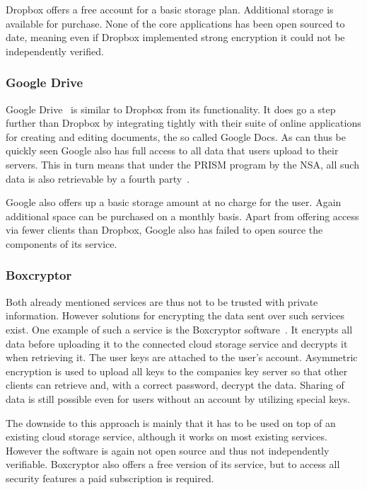 Dropbox offers a free account for a basic storage plan.
Additional storage is available for purchase.
None of the core applications has been open sourced to date, meaning even if Dropbox implemented strong encryption it could not be independently verified.

\subsubsection{Google Drive}

Google Drive~\cite{web:site:gdrive} is similar to Dropbox from its functionality.
It does go a step further than Dropbox by integrating tightly with their suite of online applications for creating and editing documents, the so called Google Docs.
As can thus be quickly seen Google also has full access to all data that users upload to their servers.
This in turn means that under the PRISM program by the NSA, all such data is also retrievable by a fourth party~\cite{web:site:rt:google}.

Google also offers up a basic storage amount at no charge for the user.
Again additional space can be purchased on a monthly basis.
Apart from offering access via fewer clients than Dropbox, Google also has failed to open source the components of its service.

\subsubsection{Boxcryptor}

Both already mentioned services are thus not to be trusted with private information.
However solutions for encrypting the data sent over such services exist.
One example of such a service is the Boxcryptor software~\cite{web:site:boxcryptor}.
It encrypts all data before uploading it to the connected cloud storage service and decrypts it when retrieving it.
The user keys are attached to the user's account.
Asymmetric encryption is used to upload all keys to the companies key server so that other clients can retrieve and, with a correct password, decrypt the data.
Sharing of data is still possible even for users without an account by utilizing special keys.

The downside to this approach is mainly that it has to be used on top of an existing cloud storage service, although it works on most existing services.
However the software is again not open source and thus not independently verifiable.
Boxcryptor also offers a free version of its service, but to access all security features a paid subscription is required.

